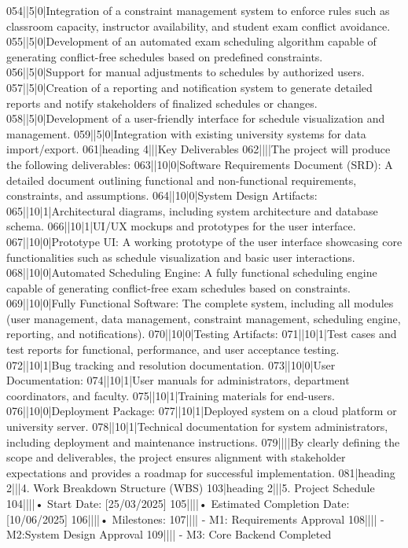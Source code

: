 054||5|0|Integration of a constraint management system to enforce rules such as classroom capacity, instructor availability, and student exam conflict avoidance.
055||5|0|Development of an automated exam scheduling algorithm capable of generating conflict-free schedules based on predefined constraints.
056||5|0|Support for manual adjustments to schedules by authorized users.
057||5|0|Creation of a reporting and notification system to generate detailed reports and notify stakeholders of finalized schedules or changes.
058||5|0|Development of a user-friendly interface for schedule visualization and management.
059||5|0|Integration with existing university systems for data import/export.
061|heading 4|||Key Deliverables
062||||The project will produce the following deliverables:
063||10|0|Software Requirements Document (SRD): A detailed document outlining functional and non-functional requirements, constraints, and assumptions.
064||10|0|System Design Artifacts:
065||10|1|Architectural diagrams, including system architecture and database schema.
066||10|1|UI/UX mockups and prototypes for the user interface.
067||10|0|Prototype UI: A working prototype of the user interface showcasing core functionalities such as schedule visualization and basic user interactions.
068||10|0|Automated Scheduling Engine: A fully functional scheduling engine capable of generating conflict-free exam schedules based on constraints.
069||10|0|Fully Functional Software: The complete system, including all modules (user management, data management, constraint management, scheduling engine, reporting, and notifications).
070||10|0|Testing Artifacts:
071||10|1|Test cases and test reports for functional, performance, and user acceptance testing.
072||10|1|Bug tracking and resolution documentation.
073||10|0|User Documentation:
074||10|1|User manuals for administrators, department coordinators, and faculty.
075||10|1|Training materials for end-users.
076||10|0|Deployment Package:
077||10|1|Deployed system on a cloud platform or university server.
078||10|1|Technical documentation for system administrators, including deployment and maintenance instructions.
079||||By clearly defining the scope and deliverables, the project ensures alignment with stakeholder expectations and provides a roadmap for successful implementation.
081|heading 2|||4. Work Breakdown Structure (WBS)
103|heading 2|||5. Project Schedule
104||||• Start Date: [25/03/2025]
105||||• Estimated Completion Date: [10/06/2025]
106||||• Milestones:
107||||  - M1: Requirements Approval
108||||  - M2:System Design Approval
109||||  - M3: Core Backend Completed
